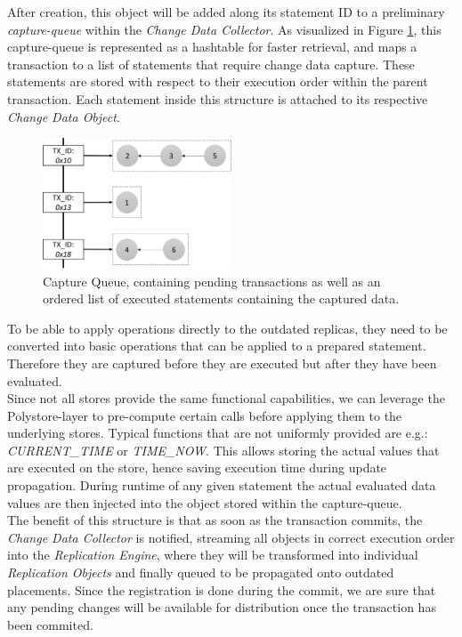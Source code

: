 After creation, this object will be added along its statement ID to a preliminary \emph{capture-queue} within the \emph{Change Data Collector}. 
As visualized in Figure \ref{fig:hashtable}, this capture-queue is represented as a hashtable for 
faster retrieval, and maps a transaction to a list of statements that require change data capture. 
These statements are stored with respect to their execution order within the parent transaction.
Each statement inside this structure is attached to its respective \emph{Change Data Object}.

\begin{figure}[t]
    \centering
    \includegraphics[width=0.5\textwidth]{Figures/hashtable.png}
    \caption{Capture Queue, containing pending transactions as well as an ordered list of executed statements containing the captured data.}
    \label{fig:hashtable}
\end{figure}

To be able to apply operations directly to the outdated replicas, they need to be converted into basic operations that can be applied to a prepared statement.
Therefore they are captured before they are executed but after they have been evaluated.\\
Since not all stores provide the same functional capabilities, we can leverage the Polystore-layer to pre-compute certain calls before applying them to the underlying stores.
Typical functions that are not uniformly provided are e.g.: \emph{CURRENT\_TIME} or \emph{TIME\_NOW}. This allows storing the actual values that are executed on the store,
hence saving execution time during update propagation.
During runtime of any given statement the actual evaluated data values are then injected into the object stored within the capture-queue.\\
The benefit of this structure is that as soon as the transaction commits, the \emph{Change Data Collector} is notified, streaming all objects in correct execution order
into the \emph{Replication Engine}, where they will be transformed into individual \emph{Replication Objects} and finally queued to be propagated onto outdated placements. 
Since the registration is done during the commit, we are sure that any pending changes will be available for distribution once the transaction has been commited.



